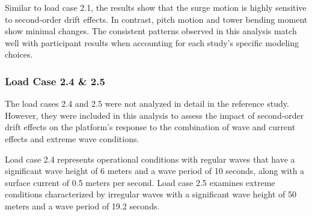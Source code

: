 \documentclass[a4paper, 11pt]{article}
\begin{document}
Similar to load case 2.1, the results show that the surge motion is highly sensitive to second-order drift effects. In contrast, pitch motion and tower bending moment show minimal changes. The consistent patterns observed in this analysis match well with participant results when accounting for each study's specific modeling choices.

\subsubsection{Load Case 2.4 \& 2.5}
\hspace{0.5cm}The load cases 2.4 and 2.5 were not analyzed in detail in the reference study. However, they were included in this analysis to assess the impact of second-order drift effects on the platform's response to the combination of wave and current effects and extreme wave conditions.

Load case 2.4 represents operational conditions with regular waves that have a significant wave height of 6 meters and a wave period of 10 seconds, along with a surface current of 0.5 meters per second. Load case 2.5 examines extreme conditions characterized by irregular waves with a significant wave height of 50 meters and a wave period of 19.2 seconds.
\end{document}
